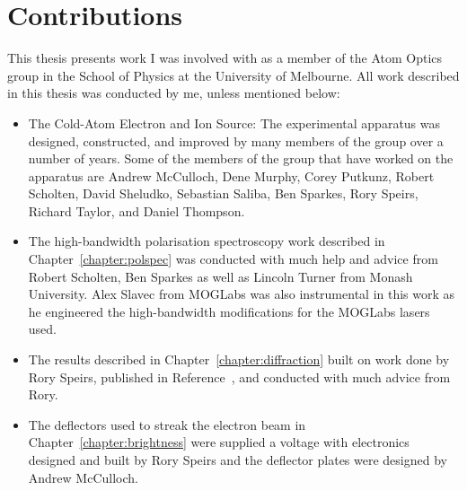 \chapter*{Contributions}

This thesis presents work I was involved with as a member of the Atom Optics group in the School of Physics at the University of Melbourne.
All work described in this thesis was conducted by me, unless mentioned below:
\begin{itemize}
\item The Cold-Atom Electron and Ion Source: The experimental apparatus was designed, constructed, and improved by many members of the group over a number of years.
Some of the members of the group that have worked on the apparatus are
Andrew McCulloch, Dene Murphy, Corey Putkunz, Robert Scholten, David Sheludko, Sebastian Saliba, Ben Sparkes, Rory Speirs, Richard Taylor, and Daniel Thompson.
\item The high-bandwidth polarisation spectroscopy work described in Chapter~\ref{chapter:polspec} was conducted with much help and advice from Robert Scholten, Ben Sparkes as well as Lincoln Turner from Monash University. Alex Slavec from MOGLabs was also instrumental in this work as he engineered the high-bandwidth modifications for the MOGLabs lasers used.
\item The results described in Chapter~\ref{chapter:diffraction} built on work done by Rory Speirs, published in Reference~\cite{speirs_single-shot_2015}, and conducted with much advice from Rory.
\item The deflectors used to streak the electron beam in Chapter~\ref{chapter:brightness} were supplied a voltage with electronics designed and built by Rory Speirs and the deflector plates were designed by Andrew McCulloch.
\end{itemize}